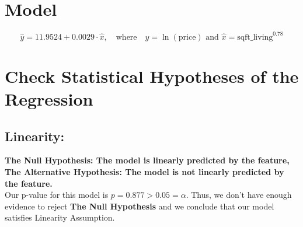 \documentclass[10pt]{article}
\begin{document}
\section*{Model}
\[\hat{y}=11.9524+0.0029\cdot \hat{x},\quad \text{where}\quad  \hat{y}=\ln (\text{price})\text{ and } \hat{x} = \text{sqft\_living}^{0.78}  \]
\section*{Check Statistical Hypotheses of the Regression}
\subsection*{Linearity:}
\textbf{The Null Hypothesis:  The model is linearly predicted by the feature,\\
The Alternative Hypothesis:  The model is not linearly predicted by the feature.}\\
Our p-value for this model is \(p=0.877 > 0.05 = \alpha\). Thus, we don't have enough evidence to reject \textbf{The Null Hypothesis} and  we conclude that our model satisfies Linearity Assumption.
\end{document}

